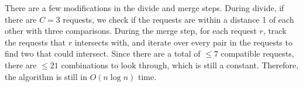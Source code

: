 \documentclass[12pt]{article}
\begin{document}
\begin{enumerate}[label=\textbf{\arabic*}]
	\par{There are a few modifications in the divide and merge steps. During divide, if there are $C = 3$ requests, we check if the requests are within a distance 1 of each other with three comparisons. During the merge step, for each request $r$, track the requests that $r$ intersects with, and iterate over every pair in the requests to find two that could intersect. Since there are a total of $\leq 7$ compatible requests, there are $\leq 21$ combinations to look through, which is still a constant. Therefore, the algorithm is still in $O(n\log{n})$ time.}
\end{enumerate}
\end{document}
